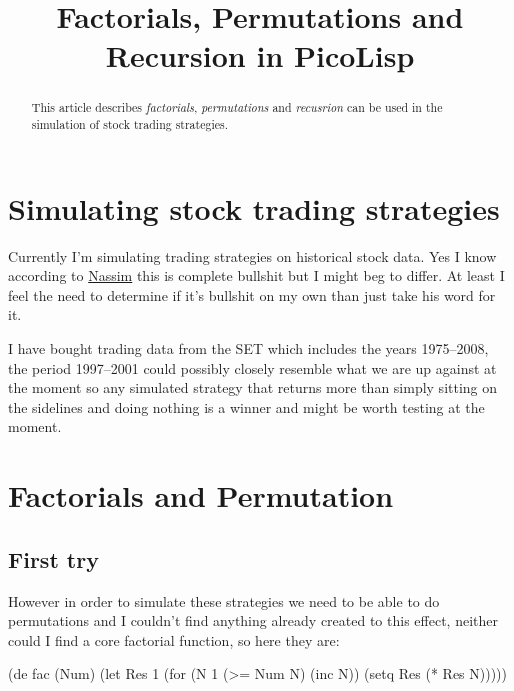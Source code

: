 \title{Factorials, Permutations and Recursion in PicoLisp}

\maketitle

\begin{abstract}
  This article describes \emph{factorials}, \emph{permutations} and
  \emph{recusrion} can be used in the simulation of stock trading
  strategies.  
\end{abstract}

\section{Simulating stock trading strategies}
\label{sec:fact-perm-recur-simulating-stock-trading-strategies}

Currently I'm simulating trading strategies on historical stock data.
Yes I know according to
\href{http://en.wikipedia.org/wiki/Nassim_taleb}{Nassim} this is
complete bullshit but I might beg to differ. At least I feel the need
to determine if it's bullshit on my own than just take his word for it.

I have bought trading data from the SET which includes the years
1975--2008, the period 1997--2001 could possibly closely resemble what
we are up against at the moment so any simulated strategy that returns
more than simply sitting on the sidelines and doing nothing is a winner
and might be worth testing at the moment.

\section{Factorials and Permutation}
\label{sec:fact-perm-recur-factorials-and-permutation}


\subsection{First try}
\label{sec:fact-perm-recur-first-try}

However in order to simulate these strategies we need to be able to do
permutations and I couldn't find anything already created to this
effect, neither could I find a core factorial function, so here they
are:

\begin{wideverbatim}
(de fac (Num)
   (let Res 1
      (for (N 1 (>= Num N) (inc N))
         (setq Res (* Res N)))))
\end{wideverbatim}

